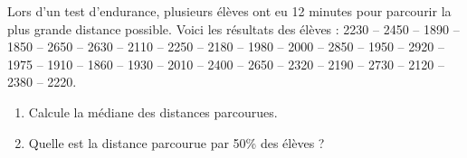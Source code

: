 
Lors d'un test d'endurance, plusieurs élèves ont eu 12 minutes pour
parcourir la plus grande distance possible. Voici les résultats des
élèves :
2230 -- 2450 -- 1890 -- 1850 -- 2650 -- 2630 -- 2110 -- 2250 -- 2180 --
1980 -- 2000 -- 2850 -- 1950 -- 2920 -- 1975 -- 1910 -- 1860 -- 1930 --
2010 -- 2400 -- 2650 -- 2320 -- 2190 -- 2730 -- 2120 -- 2380 -- 2220.

\begin{enumerate}
\item Calcule la médiane des distances parcourues.
\item Quelle est la distance parcourue par 50\% des élèves ?
\end{enumerate}